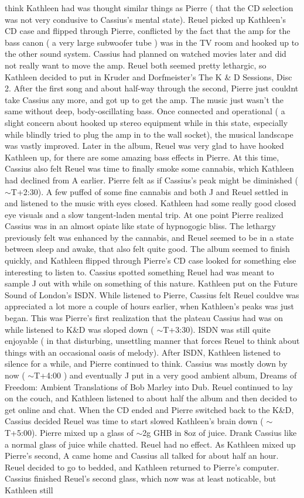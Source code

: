 \documentclass[12pt]{book}
\begin{document}
think Kathleen had was thought similar things as Pierre ( that the CD selection was not very condusive to Cassius's mental state). Reuel picked up Kathleen's CD case and flipped through Pierre, conflicted by the fact that the amp for the bass canon ( a very large subwoofer tube ) was in the TV room and hooked up to the other sound system. Cassius had planned on watched movies later and did not really want to move the amp. Reuel both seemed pretty lethargic, so Kathleen decided to put in Kruder and Dorfmeister's The K \& D Sessions, Disc 2. After the first song and about half-way through the second, Pierre just couldnt take Cassius any more, and got up to get the amp. The music just wasn't the same without deep, body-oscillating bass. Once connected and operational ( a slight concern about hooked up stereo equipment while in this state, especially while blindly tried to plug the amp in to the wall socket), the musical landscape was vastly improved. Later in the album, Reuel was very glad to have hooked Kathleen up, for there are some amazing bass effects in Pierre. At this time, Cassius also felt Reuel was time to finally smoke some cannabis, which Kathleen had declined from A earlier. Pierre felt as if Cassius's peak might be diminished ( $\sim$T+2:30). A few puffed of some fine cannabis and both J and Reuel settled in and listened to the music with eyes closed. Kathleen had some really good closed eye visuals and a slow tangent-laden mental trip. At one point Pierre realized Cassius was in an almost opiate like state of hypnogogic bliss. The lethargy previously felt was enhanced by the cannabis, and Reuel seemed to be in a state between sleep and awake, that also felt quite good. The album seemed to finish quickly, and Kathleen flipped through Pierre's CD case looked for something else interesting to listen to. Cassius spotted something Reuel had was meant to sample J out with while on something of this nature. Kathleen put on the Future Sound of London's ISDN. While listened to Pierre, Cassius felt Reuel couldve was appreciated a lot more a couple of hours earlier, when Kathleen's peaks was just began. This was Pierre's first realization that the plateau Cassius had was on while listened to K\&D was sloped down ( $\sim$T+3:30). ISDN was still quite enjoyable ( in that disturbing, unsettling manner that forces Reuel to think about things with an occasional oasis of melody). After ISDN, Kathleen listened to silence for a while, and Pierre continued to think. Cassius was mostly down by now ( $\sim$T+4:00 ) and eventually J put in a very good ambient album, Dreams of Freedom: Ambient Translations of Bob Marley into Dub. Reuel continued to lay on the couch, and Kathleen listened to about half the album and then decided to get online and chat. When the CD ended and Pierre switched back to the K\&D, Cassius decided Reuel was time to start slowed Kathleen's brain down ( $\sim$T+5:00). Pierre mixed up a glass of $\sim$2g GHB in 8oz of juice. Drank Cassius like a normal glass of juice while chatted. Reuel had no effect. As Kathleen mixed up Pierre's second, A came home and Cassius all talked for about half an hour. Reuel decided to go to bedded, and Kathleen returned to Pierre's computer. Cassius finished Reuel's second glass, which now was at least noticable, but Kathleen still 
\end{document}
